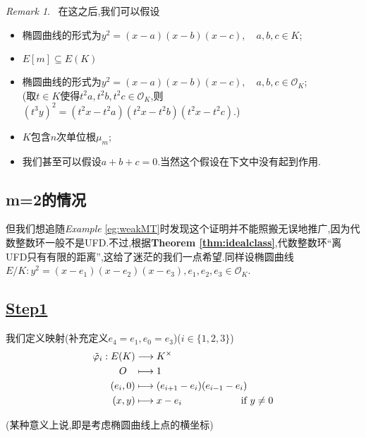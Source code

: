 \documentclass[12pt,A4paper,oneside,reqno]{amsart}
\numberwithin{equation}{section}
\theoremstyle{definition}
\theoremstyle{plain}
\theoremstyle{plain}
\numberwithin{equation}{section}
\theoremstyle{remark}
\newtheorem{remark}[theorem]{Remark}
\newcommand{\Gal}{\operatorname{Gal}}
\begin{document}
\begin{remark}\
	在这之后,我们可以假设
	\begin{itemize}
		\item 椭圆曲线的形式为$y^2=(x-a)(x-b)(x-c),\quad a,b,c \in K$;
		\item $E[m] \subseteq E(K)$
		\item 椭圆曲线的形式为$y^2=(x-a)(x-b)(x-c),\quad a,b,c \in \mathcal{O}_K$;\\
		(取$t \in K$使得$t^2a,t^2b,t^2c \in \mathcal{O}_K$,则$(t^3y)^2=(t^2x-t^2a)(t^2x-t^2b)(t^2x-t^2c)$.)
		\item $K$包含$n$次单位根$\mu_m$;
		\item 我们甚至可以假设$a+b+c=0$.当然这个假设在下文中没有起到作用.
	\end{itemize}

\end{remark}
\subsection{m=2的情况}\phantom{1}

但我们想追随\textit{Example} \ref{eg:weakMT}时发现这个证明并不能照搬无误地推广,因为代数整数环一般不是UFD.不过,根据\textbf{Theorem \ref{thm:idealclass}},代数整数环“离UFD只有有限的距离”,这给了迷茫的我们一点希望.同样设椭圆曲线$E/K:y^2=(x-e_1)(x-e_2)(x-e_3), e_1,e_2,e_3 \in \mathcal{O}_K$.
\subsection*{\underline{Step1}}我们定义映射(补充定义$e_4=e_1,e_0=e_3$)($i \in \{1,2,3\}$)
\begin{equation*}
\begin{aligned}
\tilde{\varphi}_i:E(K) &\longrightarrow K^{\times}\\
\hspace{3mm}O\hspace{3mm}& \longmapsto 1\\
(e_i,0)&\longmapsto (e_{i+1}-e_i)(e_{i-1}-e_i)\\
(x,y) &\longmapsto x-e_i \hspace{2cm}\text{ if }y \neq 0
\end{aligned}
\end{equation*}
	\begin{center}
\end{center}
(某种意义上说,即是考虑椭圆曲线上点的横坐标)
\end{document}
